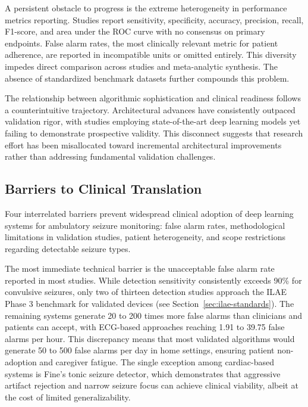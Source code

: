 A persistent obstacle to progress is the extreme heterogeneity in performance metrics reporting. Studies report sensitivity, specificity, accuracy, precision, recall, F1-score, and area under the ROC curve with no consensus on primary endpoints. False alarm rates, the most clinically relevant metric for patient adherence, are reported in incompatible units or omitted entirely. This diversity impedes direct comparison across studies and meta-analytic synthesis. The absence of standardized benchmark datasets further compounds this problem.

The relationship between algorithmic sophistication and clinical readiness follows a counterintuitive trajectory. Architectural advances have consistently outpaced validation rigor, with studies employing state-of-the-art deep learning models yet failing to demonstrate prospective validity. This disconnect suggests that research effort has been misallocated toward incremental architectural improvements rather than addressing fundamental validation challenges.

\subsection{Barriers to Clinical Translation}

Four interrelated barriers prevent widespread clinical adoption of deep learning systems for ambulatory seizure monitoring: false alarm rates, methodological limitations in validation studies, patient heterogeneity, and scope restrictions regarding detectable seizure types.

The most immediate technical barrier is the unacceptable false alarm rate reported in most studies. While detection sensitivity consistently exceeds 90\% for convulsive seizures, only two of thirteen detection studies approach the ILAE Phase 3 benchmark for validated devices (see Section~\ref{sec:ilae-standards}). The remaining systems generate 20 to 200 times more false alarms than clinicians and patients can accept, with ECG-based approaches reaching 1.91 to 39.75 false alarms per hour. This discrepancy means that most validated algorithms would generate 50 to 500 false alarms per day in home settings, ensuring patient non-adoption and caregiver fatigue. The single exception among cardiac-based systems is Fine's tonic seizure detector, which demonstrates that aggressive artifact rejection and narrow seizure focus can achieve clinical viability, albeit at the cost of limited generalizability.

